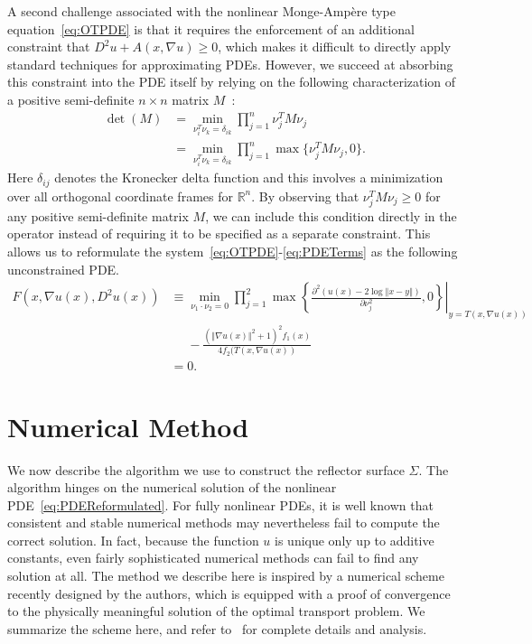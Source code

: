 \documentclass{amsart}
\newcommand{\bq}{\begin{equation}}
\newcommand{\eq}{\end{equation}}
\newcommand{\R}{\mathbb{R}}
\newcommand{\norm}[1]{\left\Vert#1\right\Vert}
\newcommand{\MA}{Monge-Amp\`ere\xspace}
\theoremstyle{lemma}
\theoremstyle{remark}
\begin{document}
A second challenge associated with the nonlinear \MA type equation~\eqref{eq:OTPDE} is that it requires the enforcement of an additional constraint that $D^2u + A(x,\nabla u) \geq 0$, which makes it difficult to directly apply standard techniques for approximating PDEs.  However, we succeed at absorbing this constraint into the PDE itself by relying on the following characterization of a positive semi-definite $n\times n$ matrix $M$~\cite{FO_MATheory}:
\bq\label{eq:matrix}
\begin{split}
\det(M) &= \min\limits_{\nu_i^T\nu_k=\delta_{ik}}\prod\limits_{j=1}^n \nu_j^TM\nu_j \\
  &= \min\limits_{\nu_i^T\nu_k=\delta_{ik}}\prod\limits_{j=1}^n \max\{\nu_j^TM\nu_j, 0\}.
\end{split}
\eq
Here $\delta_{ij}$ denotes the Kronecker delta function and this involves a minimization over all orthogonal coordinate frames for $\R^n$.  By observing that $\nu_j^TM\nu_j \geq 0$ for any positive semi-definite matrix $M$, we can include this condition directly in the operator instead of requiring it to be specified as a separate constraint.  This allows us to reformulate the system~\eqref{eq:OTPDE}-\eqref{eq:PDETerms} as the following unconstrained PDE.
\bq\label{eq:PDEReformulated}
\begin{split}
F(x,\nabla u(x), D^2u(x)) &\equiv
\min\limits_{\nu_1\cdot\nu_2 = 0}\prod\limits_{j=1}^2 \left. \max\left\{\frac{\partial^2(u(x)-2\log\norm{x-y})}{\partial\nu_j^2},0\right\} \right|_{y = T(x,\nabla u(x))}\\ &\phantom{=}- \frac{\left(\norm{\nabla u(x)}^2+1\right)^2 f_1(x)}{4f_2(T(x,\nabla u(x))}\\
 &= 0.
\end{split}
\eq




\section{Numerical Method}\label{sec:method}
We now describe the algorithm we use to construct the reflector surface $\Sigma$.  The algorithm hinges on the numerical solution of the nonlinear PDE~\eqref{eq:PDEReformulated}.  For fully nonlinear PDEs, it is well known that consistent and stable numerical methods may nevertheless fail to compute the correct solution. In fact, because the function $u$ is unique only up to additive constants, even fairly sophisticated numerical methods can fail to find any solution at all.  The method we describe here is inspired by a numerical scheme recently designed by the authors, which is equipped with a proof of convergence to the physically meaningful solution of the optimal transport problem.  We summarize the scheme here, and refer to~\cite{HT_OTonSphere,HT_OTonSphere2} for complete details and analysis.
\end{document}
